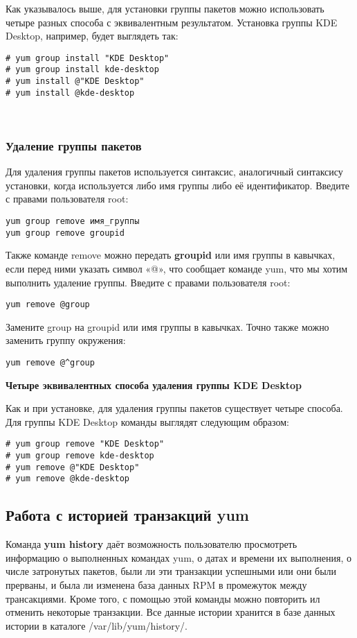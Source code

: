 \documentclass[a4paper,10pt,twoside]{article}
\begin{document}
Как указывалось выше, для установки группы пакетов можно использовать четыре  разных способа с эквивалентным результатом. Установка группы KDE Desktop, например, будет выглядеть так:
\begin{verbatim}
# yum group install "KDE Desktop"
# yum group install kde-desktop
# yum install @"KDE Desktop"
# yum install @kde-desktop
\end{verbatim} 
⁠

\subsubsection{Удаление группы пакетов}
Для удаления группы пакетов используется синтаксис, аналогичный синтаксису установки, когда используется либо имя группы либо её идентификатор. Введите с правами пользователя root: 
\begin{verbatim}
yum group remove имя_группы
yum group remove groupid
\end{verbatim} 



Также команде remove можно передать \textbf{groupid} или имя группы в кавычках, если перед ними указать символ «@», что сообщает команде yum, что мы хотим выполнить удаление группы. Введите с правами пользователя root: 
\begin{verbatim}
yum remove @group
\end{verbatim} 

Замените group на groupid или имя группы в кавычках. Точно также можно заменить группу окружения:


\begin{verbatim}
yum remove @^group
\end{verbatim} 

\textbf{Четыре эквивалентных способа удаления группы KDE Desktop}

Как и при установке, для удаления группы пакетов существует четыре способа. Для группы KDE Desktop команды выглядят следующим образом:
\begin{verbatim}
# yum group remove "KDE Desktop"
# yum group remove kde-desktop
# yum remove @"KDE Desktop"
# yum remove @kde-desktop
\end{verbatim} 


\subsection{Работа с историей транзакций yum}
Команда \textbf{yum history} даёт возможность пользователю просмотреть информацию о выполненных командах yum, о датах и времени их выполнения, о числе затронутых пакетов, были ли эти транзакции успешными или они были прерваны, и была ли изменена база данных RPM в промежуток между трансакциями. Кроме того, с помощью этой команды можно повторить ил отменить некоторые транзакции. Все данные истории хранится в базе данных истории в каталоге /var/lib/yum/history/.
\end{document}
